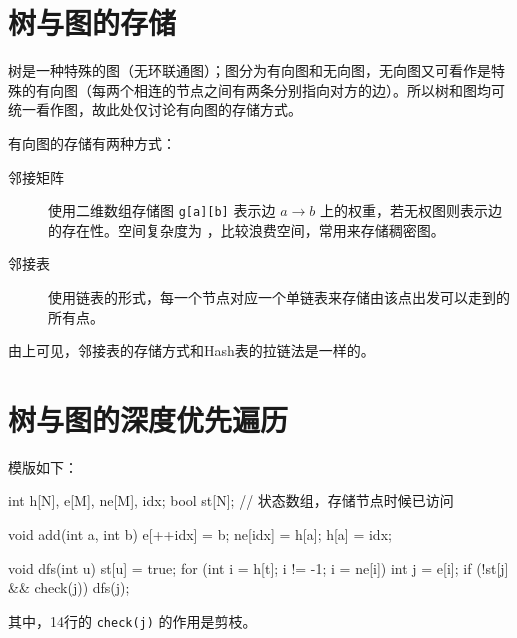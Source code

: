 \section{树与图的存储}
树是一种特殊的图（无环联通图）；图分为有向图和无向图，无向图又可看作是特殊的有向图（每两个相连的节点之间有两条分别指向对方的边）。所以树和图均可统一看作图，故此处仅讨论有向图的存储方式。

有向图的存储有两种方式：
\begin{description}
    \item[邻接矩阵]
    使用二维数组存储图 \lstinline{g[a][b]} 表示边 $a \rightarrow b$ 上的权重，若无权图则表示边的存在性。空间复杂度为  ，比较浪费空间，常用来存储稠密图。
    \item[邻接表]
    使用链表的形式，每一个节点对应一个单链表来存储由该点出发可以走到的所有点。
\end{description}
由上可见，邻接表的存储方式和Hash表的拉链法是一样的。


\section{树与图的深度优先遍历}

模版如下：
\begin{mycpptwocol}
    int h[N], e[M], ne[M], idx;
    bool st[N]; // 状态数组，存储节点时候已访问

    void add(int a, int b) {
        e[++idx] = b;
        ne[idx] = h[a];
        h[a] = idx;
    }

    void dfs(int u) {
        st[u] = true;
        for (int i = h[t]; i != -1; i = ne[i]) {
            int j = e[i];
            if (!st[j] && check(j)) {
                dfs(j);
            }
        }
    }
\end{mycpptwocol}
其中，14行的 \lstinline{check(j)} 的作用是剪枝。

